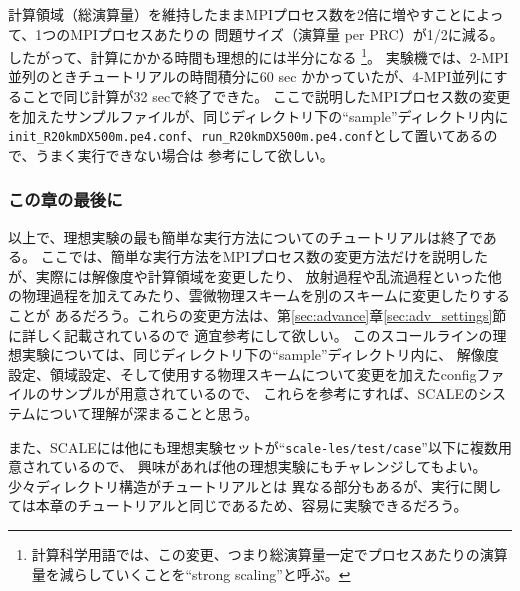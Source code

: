計算領域（総演算量）を維持したままMPIプロセス数を2倍に増やすことによって、1つのMPIプロセスあたりの
問題サイズ（演算量 per PRC）が1/2に減る。したがって、計算にかかる時間も理想的には半分になる
\footnote{計算科学用語では、この変更、つまり総演算量一定でプロセスあたりの演算量を減らしていくことを``strong scaling''と呼ぶ。}。
実験機では、2-MPI並列のときチュートリアルの時間積分に60 sec かかっていたが、4-MPI並列にすることで同じ計算が32 secで終了できた。
ここで説明したMPIプロセス数の変更を加えたサンプルファイルが、同じディレクトリ下の``sample''ディレクトリ内に
\verb|init_R20kmDX500m.pe4.conf|、\verb|run_R20kmDX500m.pe4.conf|として置いてあるので、うまく実行できない場合は
参考にして欲しい。


\subsubsection{この章の最後に}

以上で、理想実験の最も簡単な実行方法についてのチュートリアルは終了である。
ここでは、簡単な実行方法をMPIプロセス数の変更方法だけを説明したが、実際には解像度や計算領域を変更したり、
放射過程や乱流過程といった他の物理過程を加えてみたり、雲微物理スキームを別のスキームに変更したりすることが
あるだろう。これらの変更方法は、第\ref{sec:advance}章\ref{sec:adv_settings}節に詳しく記載されているので
適宜参考にして欲しい。
このスコールラインの理想実験については、同じディレクトリ下の``sample''ディレクトリ内に、
解像度設定、領域設定、そして使用する物理スキームについて変更を加えたconfigファイルのサンプルが用意されているので、
これらを参考にすれば、SCALEのシステムについて理解が深まることと思う。

また、SCALEには他にも理想実験セットが``\verb|scale-les/test/case|''以下に複数用意されているので、
興味があれば他の理想実験にもチャレンジしてもよい。少々ディレクトリ構造がチュートリアルとは
異なる部分もあるが、実行に関しては本章のチュートリアルと同じであるため、容易に実験できるだろう。




